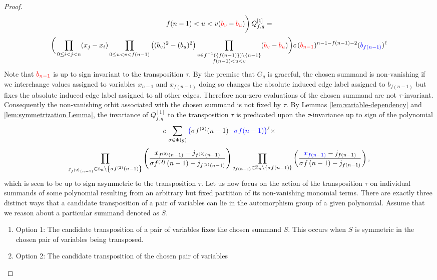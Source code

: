 \begin{proof}
\[{{f(n-1)<u<v
}
}({\color{red}b_{v}}-{\color{red}b_{u}})\bigg)\,Q_{f,g}^{\left[1\right]}=
\]
\[
\bigg(\prod_{0\leq i<j<n}(x_{j}-x_{i})\prod_{0\leq u<v<f(n-1)}\big((b_{v})^{2}-(b_{u})^{2}\big)\prod_{\substack{v\in f^{-1}(\{f(n-1)\})\backslash\{n-1\}\\
f(n-1)<u<v
}
}({\color{red}b_{v}}-{\color{red}b_{u}})\bigg)c\,({\color{red}b_{n-1}})^{n-1-f(n-1)-2}({\color{blue}b_{f\left(n-1\right)}})^{\ell}
\]
Note that ${\color{red}b_{n-1}}$ is up to sign invariant to the transposition $\tau$. By the premise that $G_g$ is graceful, the chosen summand is non-vanishing if we interchange values assigned to variables $x_{n-1}$ and $x_{f(n-1)}$ doing so changes the absolute induced edge label assigned to $b_{f(n-1)}$ but fixes the absolute induced edge label assigned to all other edges. Therefore non-zero evaluations of the chosen summand are not $\tau$-invariant. Consequently the non-vanishing orbit associated with the chosen summand is not fixed by $\tau$. By Lemmas \ref{lem:variable-dependency} and \ref{lem:symmetrization Lemma}, the invariance of $Q_{f,g}^{\left[1\right]}$ to the transposition $\tau$ is predicated upon the $\tau$-invariance up to sign of the polynomial
\[
c\,\sum_{\sigma\in\Phi(g)}{\color{blue}\big(}\sigma f^{(2)}(n-1){\color{blue}-\sigma f(n-1)\big)}^{\ell}\times
\]
\[
\prod_{j_{f^{(2)}\left(n-1\right)}\in\mathbb{Z}_{n}\backslash\left\{ \sigma f^{(2)}\left(n-1\right)\right\} }\left(\frac{x_{f^{(2)}\left(n-1\right)}-j_{f^{(2)}\left(n-1\right)}}{\sigma f^{(2)}\left(n-1\right)-j_{f^{(2)}\left(n-1\right)}}\right)\prod_{j_{f\left(n-1\right)}\in\mathbb{Z}_{n}\backslash\left\{ \sigma f\left(n-1\right)\right\} }\left(\frac{{\color{blue}x_{f\left(n-1\right)}}-j_{f\left(n-1\right)}}{\sigma f\left(n-1\right)-j_{f\left(n-1\right)}}\right),
\]
which is seen to be up to sign asymmetric to the transposition $\tau$. Let us now focus on the action of the transposition $\tau$ on individual summands of some polynomial resulting from an arbitrary but fixed partition
of its non-vanishing monomial terms. There are exactly three distinct ways that a candidate
transposition of a pair of variables can lie in the automorphism group of a
given polynomial.  Assume that we reason about
a particular summand denoted as $S$.
\begin{enumerate}
\item Option 1: The candidate transposition of a pair of variables fixes
the chosen summand $S$. This occurs when $S$ is symmetric in the
chosen pair of variables being transposed.
\item Option 2: The candidate transposition of the chosen pair of variables

\end{enumerate}
\end{proof}
